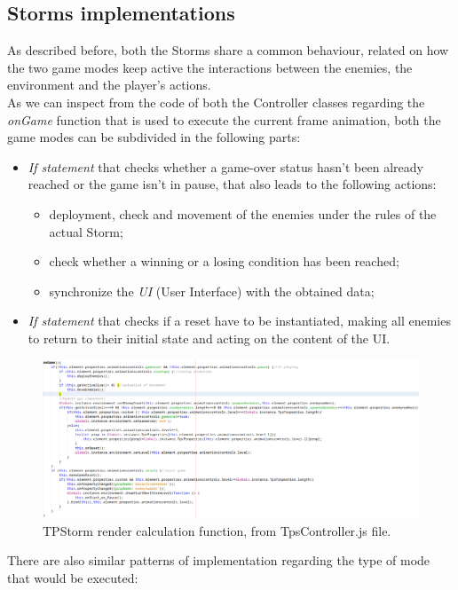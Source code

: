 \subsection{Storms implementations}
As described before, both the Storms share a common behaviour, related on how the two game modes keep active the interactions between the enemies, the environment and the player's actions.\\
As we can inspect from the code of both the Controller classes regarding the \textit{onGame} function that is used to execute the current frame animation, both the game modes can be subdivided in the following parts:
\begin{itemize}
\item \textit{If statement} that checks whether a game-over status hasn't been already reached or the game isn't in pause, that also leads to the following actions:
\begin{itemize}
\item deployment, check and movement of the enemies under the rules of the actual Storm;
\item check whether a winning or a losing condition has been reached;
\item synchronize the \textit{UI} (User Interface) with the obtained data;
\end{itemize}
\item \textit{If statement} that checks if a reset have to be instantiated, making all enemies to return to their initial state and acting on the content of the UI.
\end{itemize}
\begin{figure}[h!]
\begin{center}
\includegraphics[scale=0.3]{images/onGame-code.png}
\caption{TPStorm render calculation function, from TpsController.js file.}
\end{center}
\end{figure}
There are also similar patterns of implementation regarding the type of mode that would be executed:

